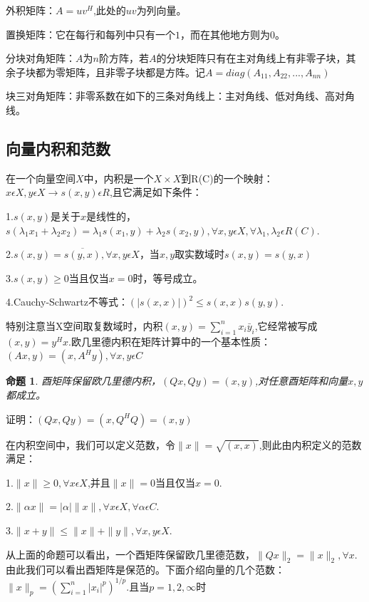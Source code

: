 \documentclass{article}
\begin{document}
外积矩阵：$A=uv^H$,此处的$uv$为列向量。

置换矩阵：它在每行和每列中只有一个$1$，而在其他地方则为$0$。

分块对角矩阵：$A$为$n$阶方阵，若$A$的分块矩阵只有在主对角线上有非零子块，其余子块都为零矩阵，且非零子块都是方阵。记$A=diag(A_{11},A_{22},...,A_{nn})$

块三对角矩阵：非零系数在如下的三条对角线上：主对角线、低对角线、高对角线。
\subsection{向量内积和范数}
在一个向量空间$X$中，内积是一个$X\times X$到R(C)的一个映射：$x\epsilon X,y\epsilon X \longrightarrow s(x,y)\epsilon R $,且它满足如下条件：

1.$s(x,y)$是关于$x$是线性的，$s(\lambda _1 x_1+\lambda _2 x_2)=\lambda _1 s(x_1,y)+\lambda _2 s(x_2,y),\forall x,y\epsilon X,\forall \lambda _1 ,\lambda _2 \epsilon R(C)$.

2.$s(x,y)=\overline{s(y,x)},\forall x,y\epsilon X$，当$x,y$取实数域时$s(x,y)=s(y,x)$

3.$s(x,y)\ge 0$当且仅当$x=0$时，等号成立。

4.Cauchy-Schwartz不等式：$(\vert s(x,x)\vert)^2\leqslant s(x,x)s(y,y)$.

特别注意当X空间取复数域时，内积$(x,y)=\sum_{i=1}^n x_i\bar{y}_i$,它经常被写成$(x,y)=y^Hx$.欧几里德内积在矩阵计算中的一个基本性质：$(Ax,y)=(x,A^Hy),\forall x,y\epsilon C$

\newtheorem{proposition}{命题}
\begin{proposition}
酉矩阵保留欧几里德内积，$(Qx,Qy)=(x,y)$,对任意酉矩阵和向量$x,y$都成立。
\end{proposition}

证明：$(Qx,Qy)=(x,Q^HQ)=(x,y)$

在内积空间中，我们可以定义范数，令$\parallel x\parallel=\sqrt{(x,x)}$,则此由内积定义的范数满足：

1.$\parallel x\parallel \ge 0,\forall x\epsilon X$,并且$\parallel x\parallel=0$当且仅当$x=0$.

2.$\parallel \alpha x\parallel =|\alpha| \parallel x\parallel,\forall x\epsilon X,\forall \alpha \epsilon C$.

3.$\parallel x+y \parallel \leqslant \parallel x\parallel + \parallel y\parallel ,\forall x,y\epsilon X$.

从上面的命题可以看出，一个酉矩阵保留欧几里德范数，$\parallel Qx \parallel_2=\parallel x \parallel_2,\forall x$.由此我们可以看出酉矩阵是保范的。下面介绍向量的几个范数：
$\parallel x \parallel_p=(\sum_{i=1}^n |x_i|^p)^{1/p}$.且当$p=1,2,\infty$时
\end{document}

